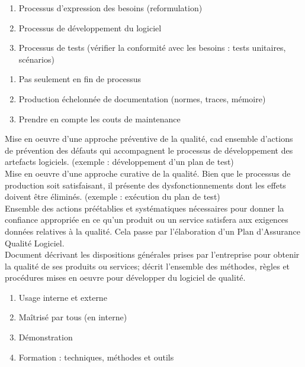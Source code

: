 \begin{enumerate}
	\item Processus d'expression des besoins (reformulation)
	\item Processus de développement du logiciel
	\item Processus de tests (vérifier la conformité avec les besoins : tests unitaires, scénarios)
\end{enumerate}

\begin{enumerate}
	\item Pas seulement en fin de processus
	\item Production échelonnée de documentation (normes, traces, mémoire)
	\item Prendre en compte les couts de maintenance
\end{enumerate}

 Mise en oeuvre d'une approche préventive de la qualité, cad ensemble d'actions de prévention des défauts qui accompagnent le processus de développement des artefacts logiciels. (exemple : développement d'un plan de test) \\

 Mise en oeuvre d'une approche curative de la qualité. Bien que le processus de production soit satisfaisant, il présente des dysfonctionnements dont les effets doivent être éliminés. (exemple : exécution du plan de test) \\

 Ensemble des actions préétablies et systématiques nécessaires pour donner la confiance appropriée en ce qu'un produit ou un service satisfera aux exigences données relatives à la qualité. Cela passe par l'élaboration d'un Plan d'Assurance Qualité Logiciel. \\

 Document décrivant les dispositions générales prises par l'entreprise pour obtenir la qualité de ses produits ou services; décrit l'ensemble des méthodes, règles et procédures mises en oeuvre pour développer du logiciel de qualité.
\begin{enumerate}
	\item Usage interne et externe
	\item Maîtrisé par tous (en interne)
	\item Démonstration
	\item Formation : techniques, méthodes et outils
\end{enumerate}

